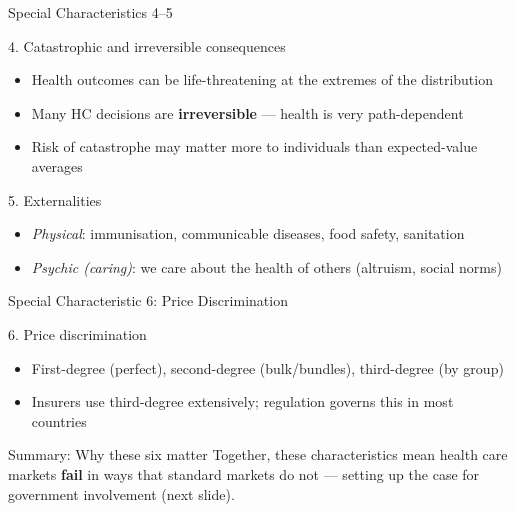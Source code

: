 \documentclass[aspectratio=169, 12pt]{beamer}
\begin{document}
\begin{frame}{Special Characteristics 4--5}
  \begin{block}{4. Catastrophic and irreversible consequences}
    \begin{itemize}
      \item Health outcomes can be life-threatening at the extremes of the distribution
      \item Many HC decisions are \textbf{irreversible} --- health is very path-dependent
      \item Risk of catastrophe may matter more to individuals than expected-value averages
    \end{itemize}
  \end{block}
  \vspace{0.4em}
  \begin{block}{5. Externalities}
    \begin{itemize}
      \item \textit{Physical}: immunisation, communicable diseases, food safety, sanitation
      \item \textit{Psychic (caring)}: we care about the health of others (altruism, social norms)
    \end{itemize}
  \end{block}
\end{frame}

\begin{frame}{Special Characteristic 6: Price Discrimination}
  \begin{block}{6. Price discrimination}
    \begin{itemize}
      \item First-degree (perfect), second-degree (bulk/bundles), third-degree (by group)
      \item Insurers use third-degree extensively; regulation governs this in most countries
    \end{itemize}
  \end{block}
  \vspace{0.6em}
  \begin{alertblock}{Summary: Why these six matter}
    Together, these characteristics mean health care markets \textbf{fail} in ways that
    standard markets do not --- setting up the case for government involvement (next slide).
  \end{alertblock}
\end{frame}
\end{document}
